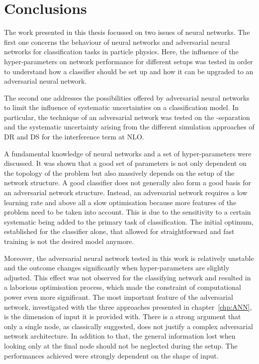 \chapter{Conclusions}

The work presented in this thesis focussed on two issues of neural networks. The first one concerns the behaviour of neural networks and adversarial neural networks for classification tasks in particle physics. Here, the influence of the hyper-parameters on network performance for different setups was tested in order to understand how a classifier should be set up and how it can be upgraded to an adversarial neural network.

The second one addresses the possibilities offered by adversarial neural networks to limit the influence of systematic uncertainties on a classification model. In particular, the technique of an adversarial network was tested on the \tW-\ttbar separation and the systematic uncertainty arising from the different simulation approaches of DR and DS for the interference term at NLO.

A fundamental knowledge of neural networks and a set of hyper-parameters were discussed. It was shown that a good set of parameters is not only dependent on the topology of the problem but also massively depends on the setup of the network structure. A good classifier does not generally also form a good basis for an adversarial network structure. Instead, an adversarial network requires a low learning rate and above all a slow optimisation because more features of the problem need to be taken into account. This is due to the sensitivity to a certain systematic being added to the primary task of classification. The initial optimum, established for the classifier alone, that allowed for straightforward and fast training is not the desired model anymore.

Moreover, the adversarial neural network tested in this work is relatively unstable and the outcome changes significantly when hyper-parameters are slightly adjusted. This effect was not observed for the classifying network and resulted in a laborious optimisation process, which made the constraint of computational power even more significant.
The most important feature of the adversarial network, investigated with the three approaches presented in chapter~\ref{chp:ANN}, is the dimension of input it is provided with. There is a strong argument that only a single node, as classically suggested, does not justify a complex adversarial network architecture. In addition to that, the general information lost when looking only at the final node should not be neglected during the setup. The performances achieved were strongly dependent on the shape of input.

